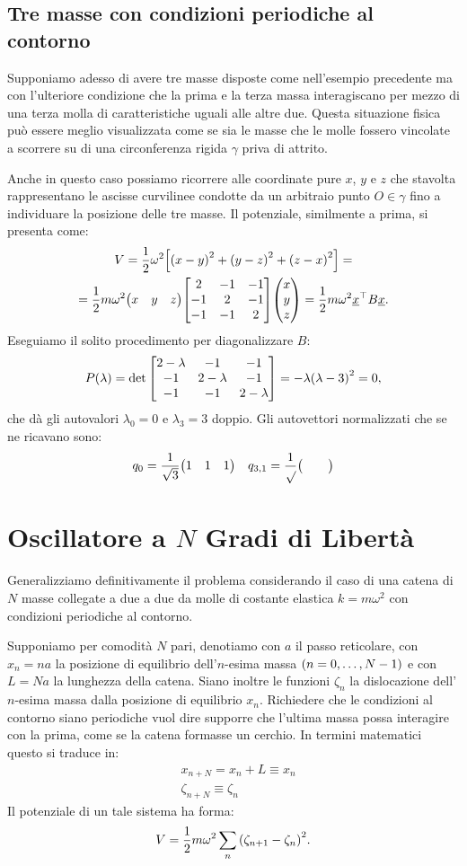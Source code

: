     \subsection{Tre masse con condizioni periodiche al contorno}
        Supponiamo adesso di avere tre masse disposte come nell'esempio precedente ma con l'ulteriore condizione che la prima e la terza massa interagiscano per mezzo di una terza molla di caratteristiche uguali alle altre due. Questa situazione fisica pu\`o essere meglio visualizzata come se sia le masse che le molle fossero vincolate a scorrere su di una circonferenza rigida $\gamma$ priva di attrito.
        \par Anche in questo caso possiamo ricorrere alle coordinate pure $x$, $y$ e $z$ che stavolta rappresentano le ascisse curvilinee condotte da un arbitraio punto $O\in\gamma$ fino a individuare la posizione delle tre masse. Il potenziale, similmente a prima, si presenta come: 
        \begin{multline*}
            V=\frac{1}{2}\omega^2\qty[\qty(x-y)^2+\qty(y-z)^2+\qty(z-x)^2]=\\=\frac{1}{2}m\omega^2\mqty(x & y & z)\mqty[\dmat[-1]{2,2,2}]\mqty(x \\ y \\ z)=\frac{1}{2}m\omega^2\underline{x}^\top B\underline{x}.
        \end{multline*}
        Eseguiamo il solito procedimento per diagonalizzare $B$:
            $$P\qty(\lambda)=\det\mqty[\dmat[-1]{2-\lambda,2-\lambda,2-\lambda}]=-\lambda\qty(\lambda-3)^2=0,$$
        che d\`a gli autovalori $\lambda_0=0$ e $\lambda_3=3$ doppio. Gli autovettori normalizzati che se ne ricavano sono:
            $$q_0=\frac{1}{\sqrt{3}}\mqty(1 & 1 & 1)\quad q_{3,1}=\frac{1}{\sqrt{}}\mqty( & & )$$
\section{Oscillatore a $N$ Gradi di Libert\`a}\label{s:Ngradi}
    Generalizziamo definitivamente il problema considerando il caso di una catena di $N$ masse collegate a due a due da molle di costante elastica $k=m\omega^2$ con condizioni periodiche al contorno. \par Supponiamo per comodit\`a $N$ pari, denotiamo con $a$ il passo reticolare, con $x_n=na$ la posizione di equilibrio dell'$n$-esima massa $\qty(n=0,\dots,N-1)$ e con $L=Na$ la lunghezza della catena. Siano inoltre le funzioni $\zeta_n$ la dislocazione dell'$n$-esima massa dalla posizione di equilibrio $x_n$. Richiedere che le condizioni al contorno siano periodiche vuol dire supporre che l'ultima massa possa interagire con la prima, come se la catena formasse un cerchio. In termini matematici questo si traduce in:
    \begin{align}
        &x_{n+N}=x_n+L\equiv x_n \label{eq:period:1}\\
        &\zeta_{n+N}\equiv \zeta_n \label{eq:period:2}
    \end{align}
    Il potenziale di un tale sistema ha forma:
    \begin{equation}
        V=\frac{1}{2}m\omega^2\sum_n\qty(\zeta_{n+1}-\zeta_n)^2.
        \label{eq:potenziale:2}
    \end{equation}

